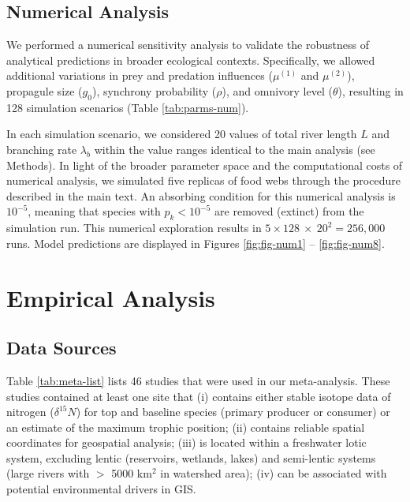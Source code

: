 \documentclass[11pt, class=article, crop=false]{standalone}
\theoremstyle{definition}
\begin{document}
\newpage

\subsection{Numerical Analysis}

We performed a numerical sensitivity analysis to validate the robustness of analytical predictions in broader ecological contexts.
Specifically, we allowed additional variations in prey and predation influences ($\mu^{(1)}$ and $\mu^{(2)}$), propagule size ($g_0$), synchrony probability ($\rho$), and omnivory level ($\theta$), resulting in 128 simulation scenarios (Table \ref{tab:parms-num}).

In each simulation scenario, we considered 20 values of total river length $L$ and branching rate $\lambda_b$ within the value ranges identical to the main analysis (see Methods).
In light of the broader parameter space and the computational costs of numerical analysis, we simulated five replicas of food webs through the procedure described in the main text.
An absorbing condition for this numerical analysis is $10^{-5}$, meaning that species with $p_k < 10^{-5}$ are removed (extinct) from the simulation run.
This numerical exploration results in $5 \times 128~\times~20^2 = 256,000$ runs.
Model predictions are displayed in Figures \ref{fig:fig-num1} -- \ref{fig:fig-num8}.



\newpage



\section{Empirical Analysis}

\subsection{Data Sources}

Table \ref{tab:meta-list} lists 46 studies that were used in our meta-analysis.
These studies contained at least one site that (i) contains either stable isotope data of nitrogen ($\delta^{15}N$) for top and baseline species (primary producer or consumer) or an estimate of the maximum trophic position; (ii) contains reliable spatial coordinates for geospatial analysis; (iii) is located within a freshwater lotic system, excluding lentic (reservoirs, wetlands, lakes) and semi-lentic systems (large rivers with $>$ 5000 km$^2$ in watershed area); (iv) can be associated with potential environmental drivers in GIS.
\end{document}
